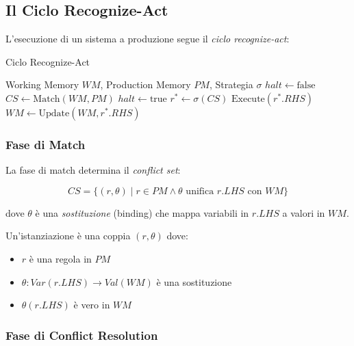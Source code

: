 \subsection{Il Ciclo Recognize-Act}

L'esecuzione di un sistema a produzione segue il \textit{ciclo recognize-act}:

\begin{algorithm}[H]
\caption{Ciclo Recognize-Act}
\label{alg:recognize_act}
\begin{algorithmic}[1]
\Require Working Memory $WM$, Production Memory $PM$, Strategia $\sigma$
\State $halt \gets \text{false}$
    \State $CS \gets \text{Match}(WM, PM)$ 
        \State $halt \gets \text{true}$ 
    \Else
        \State $r^* \gets \sigma(CS)$ 
        \State $\text{Execute}(r^*.RHS)$ 
        \State $WM \gets \text{Update}(WM, r^*.RHS)$ 
    \EndIf
\EndWhile
\end{algorithmic}
\end{algorithm}

\subsubsection{Fase di Match}

La fase di match determina il \textit{conflict set}:

\begin{equation}
CS = \{(r, \theta) \mid r \in PM \land \theta \text{ unifica } r.LHS \text{ con } WM\}
\end{equation}

dove $\theta$ è una \textit{sostituzione} (binding) che mappa variabili in $r.LHS$ a valori in $WM$.

\begin{definizione}[Istanziazione]
Un'istanziazione è una coppia $(r, \theta)$ dove:
\begin{itemize}
\item $r$ è una regola in $PM$
\item $\theta: Var(r.LHS) \to Val(WM)$ è una sostituzione
\item $\theta(r.LHS)$ è vero in $WM$
\end{itemize}
\end{definizione}

\subsubsection{Fase di Conflict Resolution}

